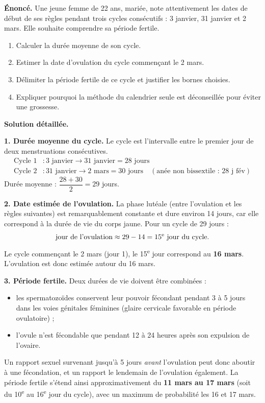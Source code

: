 \documentclass[11pt]{article}
\newcommand{\cle}[1]{{\popxbold\color{popdark}#1}}
\begin{document}
\begin{exoresolu}
\textbf{Énoncé.} Une jeune femme de 22 ans, mariée, note attentivement les dates de début de ses règles pendant trois cycles consécutifs : 3 janvier, 31 janvier et 2 mars. Elle souhaite comprendre sa période fertile.
\begin{enumerate}
\item Calculer la durée moyenne de son cycle.
\item Estimer la date d'ovulation du cycle commençant le 2 mars.
\item Délimiter la période fertile de ce cycle et justifier les bornes choisies.
\item Expliquer pourquoi la méthode du calendrier seule est déconseillée pour éviter une grossesse.
\end{enumerate}
\tcblower
\textbf{Solution détaillée.}

\textbf{1. Durée moyenne du cycle.} Le cycle est l'intervalle entre le premier jour de deux menstruations consécutives.
\begin{align*}
\text{Cycle 1} &: \text{3 janvier} \rightarrow \text{31 janvier} = 28 \text{ jours} \\
\text{Cycle 2} &: \text{31 janvier} \rightarrow \text{2 mars} = 30 \text{ jours} \quad (\text{anée non bissextile : 28 j fév})
\end{align*}
Durée moyenne : $\dfrac{28 + 30}{2} = 29$ jours.

\textbf{2. Date estimée de l'ovulation.} La phase lutéale (entre l'ovulation et les règles suivantes) est remarquablement constante et dure environ 14 jours, car elle correspond à la durée de vie du corps jaune. Pour un cycle de 29 jours :
\[
\text{jour de l'ovulation} \approx 29 - 14 = 15\textsuperscript{e} \text{ jour du cycle.}
\]
Le cycle commençant le 2 mars (jour 1), le 15\textsuperscript{e} jour correspond au \textbf{16 mars}. L'ovulation est donc estimée autour du 16 mars.

\textbf{3. Période fertile.} Deux durées de vie doivent être combinées :
\begin{itemize}
\item les \cle{spermatozoïdes} conservent leur pouvoir fécondant pendant 3 à 5 jours dans les voies génitales féminines (glaire cervicale favorable en période ovulatoire) ;
\item l'\cle{ovule} n'est fécondable que pendant 12 à 24 heures après son expulsion de l'ovaire.
\end{itemize}
Un rapport sexuel survenant jusqu'à 5 jours \emph{avant} l'ovulation peut donc aboutir à une fécondation, et un rapport le lendemain de l'ovulation également. La période fertile s'étend ainsi approximativement du \textbf{11 mars au 17 mars} (soit du 10\textsuperscript{e} au 16\textsuperscript{e} jour du cycle), avec un maximum de probabilité les 16 et 17 mars.


\end{exoresolu}
\end{document}
